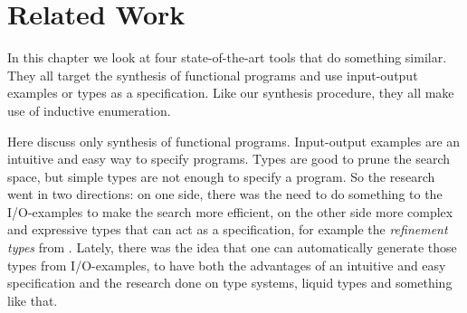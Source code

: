 \chapter{Related Work} \label{ch:relatedwork}


In this chapter we look at four state-of-the-art tools that do something similar. They all target the synthesis of functional programs and use input-output examples or types as a specification. Like our synthesis procedure, they all make use of inductive enumeration. 

Here discuss only synthesis of functional programs. Input-output examples are an intuitive and easy way to specify programs. Types are good to prune the search space, but simple types are not enough to specify a program. So the research went in two directions: on one side, there was the need to do something to the I/O-examples to make the search more efficient, on the other side more complex and expressive types that can act as a specification, for example the \emph{refinement types} from \cite{SynquidPaper}. Lately, there was the idea that one can automatically generate those types from I/O-examples, to have both the advantages of an intuitive and easy specification and the research done on type systems, liquid types and something like that.

